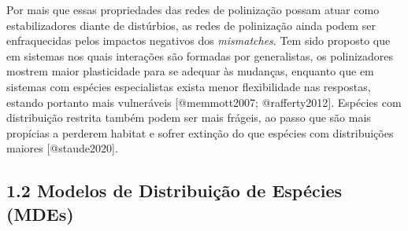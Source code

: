 \documentclass[
  11pt,
]{article}
\begin{document}
Por mais que essas propriedades das redes de polinização possam atuar
como estabilizadores diante de distúrbios, as redes de polinização ainda
podem ser enfraquecidas pelos impactos negativos dos \emph{mismatches}.
Tem sido proposto que em sistemas nos quais interações são formadas por
generalistas, os polinizadores mostrem maior plasticidade para se
adequar às mudanças, enquanto que em sistemas com espécies especialistas
exista menor flexibilidade nas respostas, estando portanto mais
vulneráveis {[}@memmott2007; @rafferty2012{]}. Espécies com distribuição
restrita também podem ser mais frágeis, ao passo que são mais propícias
a perderem habitat e sofrer extinção do que espécies com distribuições
maiores {[}@staude2020{]}.

\hypertarget{modelos-de-distribuiuxe7uxe3o-de-espuxe9cies-mdes}{%
\subsection{1.2 Modelos de Distribuição de Espécies
(MDEs)}\label{modelos-de-distribuiuxe7uxe3o-de-espuxe9cies-mdes}}
\end{document}
